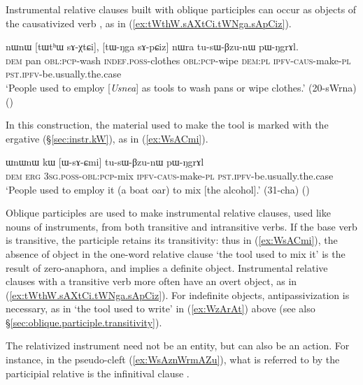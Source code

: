 Instrumental relative clauses built with oblique participles can occur as objects of the causativized verb , as in (\ref{ex:tWthW.sAXtCi.tWNga.sApCiz}).

\begin{exe}
\ex \label{ex:tWthW.sAXtCi.tWNga.sApCiz}
\gll nɯnɯ [tɯtʰɯ sɤ-χtɕi], [tɯ-ŋga sɤ-pɕiz] nɯra tu-sɯ-βzu-nɯ pɯ-ŋgrɤl. \\
\textsc{dem} pan \textsc{obl}:\textsc{pcp}-wash \textsc{indef}.\textsc{poss}-clothes \textsc{obl}:\textsc{pcp}-wipe \textsc{dem}:\textsc{pl} \textsc{ipfv}-\textsc{caus}-make-\textsc{pl} \textsc{pst}.\textsc{ipfv}-be.usually.the.case \\
\glt `People used to employ [\textit{Usnea}] as tools to wash pans or wipe clothes.' (20-sWrna) ()
\end{exe} 

In this construction, the material used to make the tool is marked with the ergative (§\ref{sec:instr.kW}), as in (\ref{ex:WsACmi}).

\begin{exe}
\ex \label{ex:WsACmi}
\gll ɯnɯnɯ kɯ [ɯ-sɤ-ɕmi] tu-sɯ-βzu-nɯ pɯ-ŋgrɤl \\
\textsc{dem} \textsc{erg} \textsc{3sg}.\textsc{poss}-\textsc{obl}:\textsc{pcp}-mix \textsc{ipfv}-\textsc{caus}-make-\textsc{pl} \textsc{pst}.\textsc{ipfv}-be.usually.the.case \\
\glt `People used to employ it (a boat oar) to mix [the alcohol].' (31-cha) 	()
\end{exe}  

Oblique participles are used to make instrumental relative clauses, used like nouns of instruments, from both transitive and intransitive verbs. If the base verb is transitive, the participle retains its transitivity: thus in (\ref{ex:WsACmi}), the absence of object in the one-word relative clause  `the tool used to mix it' is the result of zero-anaphora, and implies a definite object. Instrumental relative clauses with a transitive verb more often have an overt object, as in (\ref{ex:tWthW.sAXtCi.tWNga.sApCiz}). For indefinite objects, antipassivization is necessary, as in  `the tool used to write' in (\ref{ex:WzArAt}) above (see also  §\ref{sec:oblique.participle.transitivity}). 

The relativized instrument need not be an entity, but can also be an action. For instance, in the pseudo-cleft (\ref{ex:WsAznWrmAZu}), what is referred to by the participial relative is the infinitival clause .

